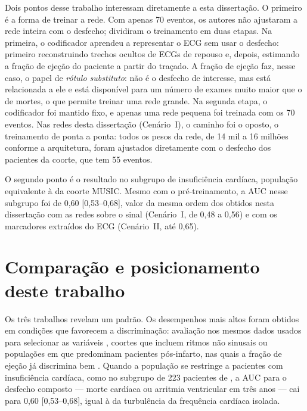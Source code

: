 Dois pontos desse trabalho interessam diretamente a esta dissertação. O
primeiro é a forma de treinar a rede. Com apenas 70 eventos, os autores não
ajustaram a rede inteira com o desfecho; dividiram o treinamento em duas
etapas. Na primeira, o codificador aprendeu a representar o \gls{ECG} sem
usar o desfecho: primeiro reconstruindo trechos ocultos de \gls{ECG}s de
repouso e, depois, estimando a fração de ejeção do paciente a partir do
traçado. A fração de ejeção faz, nesse caso, o papel de \textit{rótulo
substituto}: não é o desfecho de interesse, mas está relacionada a ele e
está disponível para um número de exames muito maior que o de mortes, o que
permite treinar uma rede grande. Na segunda etapa, o codificador foi mantido
fixo, e apenas uma rede pequena foi treinada com os 70 eventos. Nas redes
desta dissertação (Cenário~I), o caminho foi o oposto, o treinamento de
ponta a ponta: todos os pesos da rede, de 14 mil a 16 milhões conforme a
arquitetura, foram ajustados diretamente com o desfecho dos pacientes da
coorte, que tem 55 eventos.

O segundo ponto é o resultado no subgrupo de insuficiência cardíaca,
população equivalente à da coorte MUSIC. Mesmo com o pré-treinamento, a
\gls{AUC} nesse subgrupo foi de 0,60 [0,53--0,68], valor da mesma ordem dos
obtidos nesta dissertação com as redes sobre o sinal (Cenário~I, de 0,48 a
0,56) e com os marcadores extraídos do \gls{ECG} (Cenário~II, até 0,65).

\section{Comparação e posicionamento deste trabalho}
\label{sec:trab-comparacao}

Os três trabalhos revelam um padrão. Os desempenhos mais altos foram obtidos em
condições que favorecem a discriminação: avaliação nos mesmos dados usados
para selecionar as variáveis \cite{ramirez2017sudden}, coortes que incluem
ritmos não sinusais \cite{swee2026multimodal} ou populações em que
predominam pacientes pós-infarto, nas quais a fração de ejeção já
discrimina bem \cite{kim2025deep}. Quando a população se restringe a
pacientes com insuficiência cardíaca, como no subgrupo de 223 pacientes de
, a \gls{AUC} para o desfecho composto --- morte
cardíaca ou arritmia ventricular em três anos --- cai para 0,60
[0,53--0,68], igual à da turbulência da frequência cardíaca isolada.

